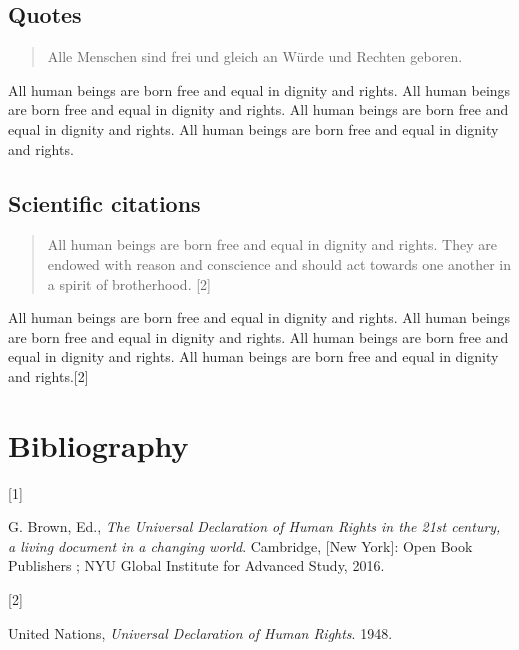 \documentclass[
  ngerman,
  american,
  ]{scrartcl}
\newlength{\cslhangindent}
\newlength{\csllabelwidth}
\newenvironment{CSLReferences}[2] %
 {\begin{list}{}{%
  \setlength{\itemindent}{0pt}
  \setlength{\leftmargin}{0pt}
  \setlength{\parsep}{0pt}
  \ifodd #1
   \setlength{\leftmargin}{\cslhangindent}
   \setlength{\itemindent}{-1\cslhangindent}
  \fi
  \setlength{\itemsep}{#2\baselineskip}}}
 {\end{list}}
\newcommand{\CSLLeftMargin}[1]{\parbox[t]{\csllabelwidth}{\strut#1\strut}}
\newcommand{\CSLRightInline}[1]{\parbox[t]{\linewidth - \csllabelwidth}{\strut#1\strut}}
\begin{document}
\subsection{Quotes}\label{quotes}

\begin{otherlanguage}{ngerman}

\begin{quote}
Alle Menschen sind frei und gleich an Würde und Rechten geboren.
\end{quote}

\end{otherlanguage}

All human beings are born free and equal in dignity and rights. All
human beings are born free and equal in dignity and rights. All human
beings are born free and equal in dignity and rights. All human beings
are born free and equal in dignity and rights.

\subsection{Scientific citations}\label{scientific-citations}

\begin{quote}
All human beings are born free and equal in dignity and rights. They are
endowed with reason and conscience and should act towards one another in
a spirit of brotherhood. {[}2{]}
\end{quote}

All human beings are born free and equal in dignity and rights. All
human beings are born free and equal in dignity and rights. All human
beings are born free and equal in dignity and rights. All human beings
are born free and equal in dignity and rights.{[}2{]}

\section{Bibliography}\label{bibliography}

\protect{}\label{refs}
\begin{CSLReferences}{0}{0}
\CSLLeftMargin{{[}1{]} }%
\CSLRightInline{G. Brown, Ed., \emph{The {Universal} {Declaration} of
{Human} {Rights} in the 21st century, a living document in a changing
world}. Cambridge, {[}New York{]}: Open Book Publishers ; NYU Global
Institute for Advanced Study, 2016.}

\CSLLeftMargin{{[}2{]} }%
\CSLRightInline{United Nations, \emph{Universal Declaration of Human
Rights}. 1948.}

\end{CSLReferences}
\end{document}

